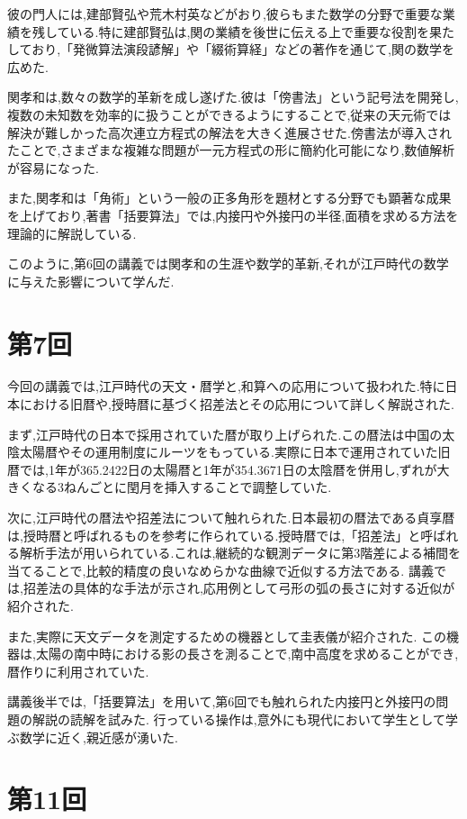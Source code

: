 \documentclass[autodetect-engine, dvi=dvipdfmx, 10pt, a4paper, ja=standard]{bxjsarticle}
\begin{document}
彼の門人には,建部賢弘や荒木村英などがおり,彼らもまた数学の分野で重要な業績を残している.特に建部賢弘は,関の業績を後世に伝える上で重要な役割を果たしており,「発微算法演段諺解」や「綴術算経」などの著作を通じて,関の数学を広めた.

関孝和は,数々の数学的革新を成し遂げた.彼は「傍書法」という記号法を開発し,複数の未知数を効率的に扱うことができるようにすることで,従来の天元術では解決が難しかった高次連立方程式の解法を大きく進展させた.傍書法が導入されたことで,さまざまな複雑な問題が一元方程式の形に簡約化可能になり,数値解析が容易になった.

また,関孝和は「角術」という一般の正多角形を題材とする分野でも顕著な成果を上げており,著書「括要算法」では,内接円や外接円の半径,面積を求める方法を理論的に解説している.

このように,第6回の講義では関孝和の生涯や数学的革新,それが江戸時代の数学に与えた影響について学んだ.

\section{第7回}


今回の講義では,江戸時代の天文・暦学と,和算への応用について扱われた.特に日本における旧暦や,授時暦に基づく招差法とその応用について詳しく解説された.

まず,江戸時代の日本で採用されていた暦が取り上げられた.この暦法は中国の太陰太陽暦やその運用制度にルーツをもっている.実際に日本で運用されていた旧暦では,1年が365.2422日の太陽暦と1年が354.3671日の太陰暦を併用し,ずれが大きくなる3ねんごとに閏月を挿入することで調整していた.

次に,江戸時代の暦法や招差法について触れられた.日本最初の暦法である貞享暦は,授時暦と呼ばれるものを参考に作られている.授時暦では,「招差法」と呼ばれる解析手法が用いられている.これは,継続的な観測データに第3階差による補間を当てることで,比較的精度の良いなめらかな曲線で近似する方法である.
講義では,招差法の具体的な手法が示され,応用例として弓形の弧の長さに対する近似が紹介された.

また,実際に天文データを測定するための機器として圭表儀が紹介された.
この機器は,太陽の南中時における影の長さを測ることで,南中高度を求めることができ,暦作りに利用されていた.

講義後半では,「括要算法」を用いて,第6回でも触れられた内接円と外接円の問題の解説の読解を試みた.
行っている操作は,意外にも現代において学生として学ぶ数学に近く,親近感が湧いた.

\section{第11回}
\end{document}
